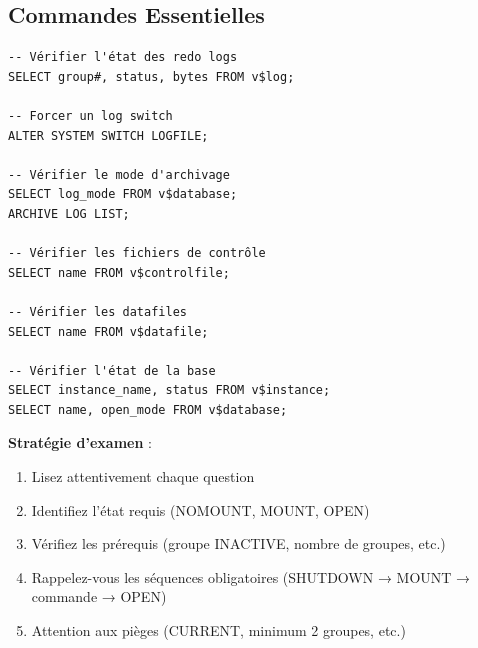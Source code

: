 \documentclass[11pt,a4paper]{article}
\begin{document}
\subsection{Commandes Essentielles}

\begin{commandebox}
\begin{lstlisting}
-- Vérifier l'état des redo logs
SELECT group#, status, bytes FROM v$log;

-- Forcer un log switch
ALTER SYSTEM SWITCH LOGFILE;

-- Vérifier le mode d'archivage
SELECT log_mode FROM v$database;
ARCHIVE LOG LIST;

-- Vérifier les fichiers de contrôle
SELECT name FROM v$controlfile;

-- Vérifier les datafiles
SELECT name FROM v$datafile;

-- Vérifier l'état de la base
SELECT instance_name, status FROM v$instance;
SELECT name, open_mode FROM v$database;
\end{lstlisting}
\end{commandebox}

\begin{tipbox}
\textbf{Stratégie d'examen} : 
\begin{enumerate}
    \item Lisez attentivement chaque question
    \item Identifiez l'état requis (NOMOUNT, MOUNT, OPEN)
    \item Vérifiez les prérequis (groupe INACTIVE, nombre de groupes, etc.)
    \item Rappelez-vous les séquences obligatoires (SHUTDOWN → MOUNT → commande → OPEN)
    \item Attention aux pièges (CURRENT, minimum 2 groupes, etc.)
\end{enumerate}
\end{tipbox}
\end{document}
